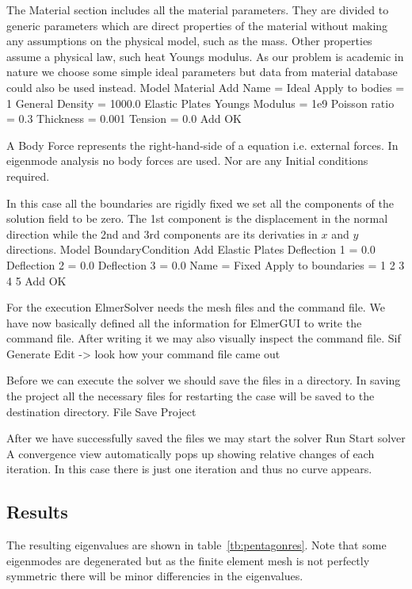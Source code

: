 The Material section includes all the material parameters.
They are divided to generic parameters which are direct properties of the material
without making any assumptions on the physical model, such as the mass. Other properties assume
a physical law, such heat Youngs modulus. As our problem is academic in nature we choose some 
simple ideal parameters but data from material database could also be used instead.
\ttbegin
Model
  Material
    Add 
      Name = Ideal
      Apply to bodies = 1 
      General    
        Density = 1000.0
      Elastic Plates
        Youngs Modulus = 1e9
        Poisson ratio = 0.3
        Thickness = 0.001
        Tension = 0.0	
      Add
      OK
\ttend

A Body Force represents the right-hand-side of a equation i.e. external forces. In eigenmode analysis
no body forces are used. Nor are any Initial conditions required.

In this case all the boundaries are rigidly fixed we set all the components of the 
solution field to be zero. The 1st component is the displacement in the normal direction
while the 2nd and 3rd components are its derivaties in $x$ and $y$ directions.
\ttbegin
Model
  BoundaryCondition
    Add 
      Elastic Plates
        Deflection 1 = 0.0
        Deflection 2 = 0.0
        Deflection 3 = 0.0
      Name = Fixed
      Apply to boundaries = 1 2 3 4 5
      Add
      OK
\ttend   

For the execution 
ElmerSolver needs the mesh files and the command file. We have now basically defined
all the information for ElmerGUI to write the command file. After writing it we may also visually 
inspect the command file.
\ttbegin
Sif 
  Generate
  Edit -> look how your command file came out  
\ttend

Before we can execute the solver we should save the files in a directory. In saving the project all the
necessary files for restarting the case will be saved to the 
destination directory.
\ttbegin
File 
  Save Project
\ttend

After we have successfully saved the files we may start the solver
\ttbegin
Run
  Start solver
\ttend
A convergence view automatically pops up showing relative changes of each iteration.
In this case there is just one iteration and thus no curve appears.

\subsection*{Results}
The resulting eigenvalues are shown in table~\ref{tb:pentagonres}.
Note that some eigenmodes are degenerated but as the finite element mesh is not
perfectly symmetric there will be minor differencies in the eigenvalues.

